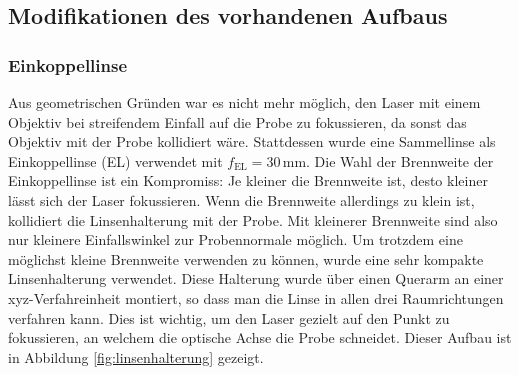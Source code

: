 \documentclass[a4paper, titlepage,  ngerman]{book}
\begin{document}
	\subsection{Modifikationen des vorhandenen Aufbaus}
	\label{sec:OpticalChanges}
	\subsubsection{Einkoppellinse}
	Aus geometrischen Gründen war es nicht mehr möglich, den Laser mit einem Objektiv bei streifendem Einfall auf die Probe zu fokussieren, da sonst das Objektiv mit der Probe kollidiert wäre. Stattdessen wurde eine Sammellinse als Einkoppellinse (EL) verwendet mit $f_{\mathrm{EL}}= 30\,\mathrm{mm}$. Die Wahl der Brennweite der Einkoppellinse ist ein Kompromiss: Je kleiner die Brennweite ist, desto kleiner lässt sich der Laser fokussieren. Wenn die Brennweite allerdings zu klein ist, kollidiert die Linsenhalterung mit der Probe. Mit kleinerer Brennweite sind also nur kleinere Einfallswinkel zur Probennormale möglich. Um trotzdem eine möglichst kleine Brennweite verwenden zu können, wurde eine sehr kompakte Linsenhalterung verwendet. Diese Halterung wurde über einen Querarm an einer xyz-Verfahreinheit montiert, so dass man die Linse in allen drei Raumrichtungen verfahren kann. Dies ist wichtig, um den Laser gezielt auf den Punkt zu fokussieren, an welchem die optische Achse die Probe schneidet. Dieser Aufbau ist in Abbildung \ref{fig:linsenhalterung} gezeigt.
\end{document}
